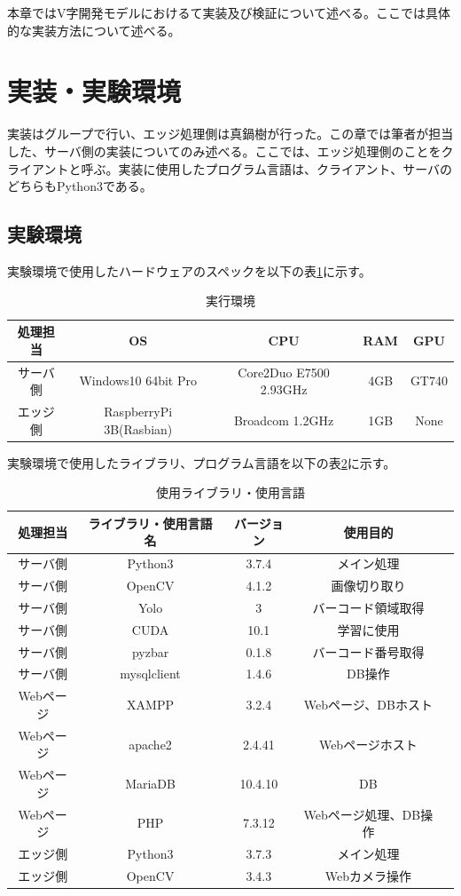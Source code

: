 本章ではV字開発モデルにおけるて実装及び検証について述べる。ここでは具体的な実装方法について述べる。
\section{実装・実験環境}
実装はグループで行い、エッジ処理側は真鍋樹が行った。この章では筆者が担当した、サーバ側の実装についてのみ述べる。ここでは、エッジ処理側のことをクライアントと呼ぶ。実装に使用したプログラム言語は、クライアント、サーバのどちらもPython3である。


\subsection*{実験環境}
実験環境で使用したハードウェアのスペックを以下の表\ref{spec}に示す。
\begin{table}[htb]
\begin{center}
\caption{実行環境}
\begin{tabular}{|c|c|c|c|c|} \hline
処理担当 & OS & CPU & RAM & GPU \\ \hline
サーバ側 & Windows10 64bit Pro & Core2Duo E7500 2.93GHz & 4GB & GT740 \\ \hline
エッジ側 & RaspberryPi 3B(Rasbian) & Broadcom 1.2GHz & 1GB & None \\ \hline
\end{tabular}
\label{spec}
	\end{center}
\end{table}


実験環境で使用したライブラリ、プログラム言語を以下の表\ref{library_spec}に示す。
\begin{table}[htb]
\begin{center}
\caption{使用ライブラリ・使用言語}
\begin{tabular}{|c|c|c|c|c|} \hline
処理担当 & ライブラリ・使用言語名 & バージョン & 使用目的 \\ \hline \hline
サーバ側 & Python3 & 3.7.4 & メイン処理	\\ \hline
サーバ側 & OpenCV & 4.1.2 & 画像切り取り\\ \hline
サーバ側 & Yolo & 3 & バーコード領域取得\\ \hline
サーバ側 & CUDA & 10.1 & 学習に使用\\ \hline
サーバ側 & pyzbar & 0.1.8 & バーコード番号取得\\ \hline
サーバ側 & mysqlclient & 1.4.6 & DB操作\\ \hline \hline
Webページ & XAMPP & 3.2.4 & Webページ、DBホスト\\ \hline
Webページ & apache2 & 2.4.41 & Webページホスト\\ \hline
Webページ & MariaDB & 10.4.10 & DB\\ \hline
Webページ & PHP & 7.3.12 & Webページ処理、DB操作\\ \hline \hline
エッジ側 & Python3 & 3.7.3 & メイン処理		\\ \hline
エッジ側 & OpenCV & 3.4.3 & Webカメラ操作\\ \hline
\end{tabular}
\label{library_spec}
	\end{center}
\end{table}


